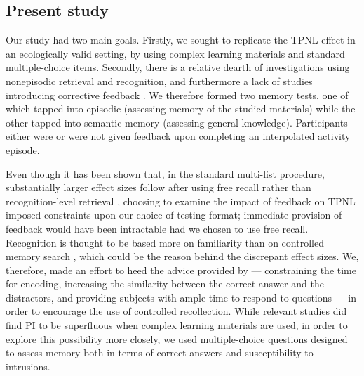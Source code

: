 \documentclass[../main.tex]{subfiles}
\begin{document}
\subsection{Present study\label{present}}

Our study had two main goals. Firstly, we sought to replicate the TPNL 
effect in an ecologically valid setting, by using complex learning materials 
and standard multiple-choice items. Secondly, there 
is a relative dearth of 
investigations using nonepisodic retrieval and 
recognition, and furthermore 
a lack of studies introducing corrective feedback 
\citep{chanRetrievalPotentiatesNew2018}. We therefore 
formed two memory 
tests, one of which tapped into episodic (assessing 
memory of the studied 
materials) while the other tapped into semantic 
memory (assessing general 
knowledge). Participants either were or were not 
given feedback upon 
completing an interpolated activity episode.

Even though it has been shown that, in the standard 
multi-list procedure, 
substantially larger effect sizes follow after 
using free recall rather than 
recognition-level retrieval  
\citep{chanRetrievalPotentiatesNew2018}, 
choosing to examine the impact of feedback on TPNL 
imposed constraints upon 
our choice of testing format; immediate provision of 
feedback would have 
been intractable had we chosen to use free recall. 
Recognition is thought to 
be based more on familiarity than on controlled 
memory search 
\citep{yonelinasNatureRecollectionFamiliarity2002}, 
which could be the 
reason behind the discrepant effect sizes. We, 
therefore, made an effort to 
heed the advice provided by 
\cite{chanTestingEffectRecognition2007} --- 
constraining the time for encoding, increasing the 
similarity between the 
correct answer and the distractors, and providing 
subjects with ample time 
to respond to questions --- in order to encourage 
the use of controlled 
recollection. While relevant studies did find PI to 
be superfluous when 
complex learning materials are used, in order to 
explore this possibility 
more closely, we used multiple-choice questions 
designed to assess memory 
both in terms of correct answers and susceptibility 
to intrusions. 
\end{document}
